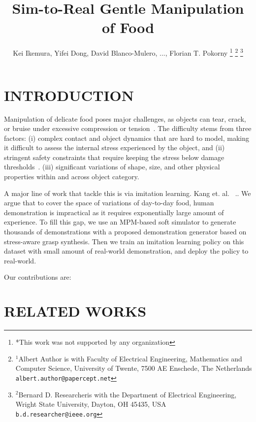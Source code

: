 \documentclass[letterpaper, 10 pt, conference]{ieeeconf}  %
\title{\LARGE \bf
Sim-to-Real Gentle Manipulation of Food
}
\author{Kei Ikemura, Yifei Dong, David Blanco-Mulero, ..., Florian T. Pokorny%
\thanks{*This work was not supported by any organization}%
\thanks{$^{1}$Albert Author is with Faculty of Electrical Engineering, Mathematics and Computer Science,
        University of Twente, 7500 AE Enschede, The Netherlands
        {\tt\small albert.author@papercept.net}}%
\thanks{$^{2}$Bernard D. Researcheris with the Department of Electrical Engineering, Wright State University,
        Dayton, OH 45435, USA
        {\tt\small b.d.researcher@ieee.org}}%
}
\begin{document}
\maketitle
\thispagestyle{empty}
\pagestyle{empty}


\begin{abstract}


\end{abstract}




\section{INTRODUCTION}
Manipulation of delicate food poses major challenges, as objects can tear, crack, or bruise under excessive compression or tension~\cite{zhu2025deformable,blanco2024t}. The difficulty stems from three factors: (i) complex contact and object dynamics that are hard to model, making it difficult to assess the internal stress experienced by the object, and (ii) stringent safety constraints that require keeping the stress below damage thresholds~\cite{yin2021modeling,arriola2020modeling}. (iii) significant variations of shape, size, and other physical properties within and across object category.

A major line of work that tackle this is via imitation learning. Kang et. al.~\cite{kang2026learning} .. We argue that to cover the space of variations of day-to-day food, human demonstration is impractical as it requires exponentially large amount of experience. To fill this gap, we use an MPM-based soft simulator to generate thousands of demonstrations with a proposed demonstration generator based on stress-aware grasp synthesis. Then we train an imitation learning policy on this dataset with small amount of real-world demonstration, and deploy the policy to real-world.

Our contributions are:

\section{RELATED WORKS}
\end{document}
